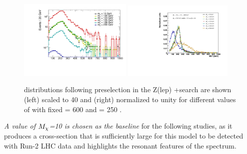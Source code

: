 \begin{figure}
\centering
\includegraphics[width=0.48\textwidth]{texinputs/04_grid/figures/monoz/leptonic/mDMScan_mA600_ma250_MET.pdf}
\includegraphics[width=0.47\textwidth]{texinputs/04_grid/figures/monoz/leptonic/mDMscan_ma250.pdf}
\caption{\MET distributions following preselection in the Z(lep) +\MET search are shown (left) scaled to 40 \ifb and (right) normalized to unity for different values of \mDM with fixed \mA = 600 \GeV and \ma = 250 \GeV.}
\label{fig:dm_scan_ll}
\end{figure}

\textit{A value of $M_{\chi}$=10 is chosen as the baseline} for the following studies, as it produces a cross-section that is sufficiently large for this model to be detected with Run-2 LHC data and highlights the resonant features of the \MET spectrum.